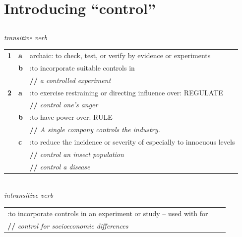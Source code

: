 \section{Introducing ``control''}
\subsection{}

\begin{frame}
\myPause
\emph{transitive verb}
\begin{tabular}{lll}
 \bf{1} & \bf{a} & archaic: to check, test, or verify by evidence or experiments \\
        & \bf{b} & :to incorporate suitable controls in \\
        &        & \textbf{//} \emph{a controlled experiment} \\
 \bf{2} & \bf{a} & :to exercise restraining or directing influence over: REGULATE \\
        &        & \textbf{//} \emph{control one's anger} \\
        & \bf{b} & :to have power over: RULE \\
        &        & \textbf{//} \emph{A single company controls the industry.} \\
        & \bf{c} & :to reduce the incidence or severity of especially to innocuous levels \\
        &        & \textbf{//} \emph{control an insect population} \\
        &        & \textbf{//} \emph{control a disease} \\
\end{tabular}\\
\vspace{2mm}\emph{intransitive verb}\\
\begin{tabular}{lll}
 :to incorporate controls in an experiment or study -- used with for \\
 \textbf{//} \emph{control for socioeconomic differences}\\
\end{tabular}
\end{frame}

